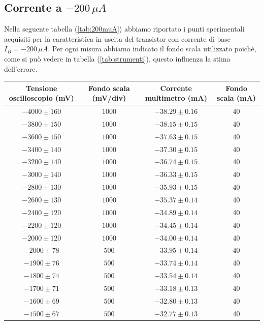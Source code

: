 \documentclass[]{article}
\begin{document}
\subsection{Corrente a $ -200\,\mu A $}
Nella seguente tabella (\ref{tab:200muA}) abbiamo riportato i punti sperimentali acquisiti per la caratteristica in uscita del transistor con corrente di base $ I_{B}= -200\,\mu A $. Per ogni misura abbiamo indicato il fondo scala utilizzato poichè, come si può vedere in tabella (\ref{tab:strumenti}), questo influenza la stima dell'errore.
	\begin{table}[H]
		\centering
	\begin{tabular}{|c|c|c|c|}
		\hline
		Tensione oscilloscopio (mV)& Fondo scala (mV/div) & Corrente multimetro (mA) &Fondo scala (mA)\\
		\hline
		$ -4000\pm 160 $ &$ 1000 $ & $ -38.29\pm 0.16 $ &40\\
		\hline
		$-3800\pm150 $ &$ 1000 $ & $ -38.15\pm0.15 $ &40 \\
		\hline
		$ -3600\pm 150 $ &$ 1000 $ & $ -37.63\pm 0.15 $ &40 \\
		\hline
		$ -3400\pm 140 $ &$ 1000 $ & $ -37.30\pm 0.15 $ &40 \\
		\hline
		$ -3200\pm 140 $ &$ 1000 $ & $-36.74\pm 0.15$ &40 \\
		\hline
		$ -3000\pm 140 $ &$ 1000 $ & $ -36.33\pm 0.15 $ &40 \\
		\hline
		$ -2800\pm 130 $ &$ 1000 $ & $ -35.93\pm 0.15 $ &40 \\
		\hline
		$ -2600\pm 130 $ &$ 1000 $ & $ -35.37\pm 0.14 $ &40 \\
		\hline
		$ -2400\pm 120 $ &$ 1000 $ & $ -34.89\pm 0.14 $ &40 \\
		\hline
		$ -2200\pm 120 $ &$ 1000 $ & $ -34.45\pm 0.14 $ &40 \\
		\hline
		$ -2000\pm 120 $ &$ 1000 $ & $ -34.00\pm0.14 $  &40\\
		\hline
		$ -2000\pm 78 $ &$ 500 $ & $ -33.95\pm0.14 $  &40\\
		\hline
		$ -1900\pm 76 $ &$ 500 $ & $ -33.74\pm0.14 $  &40\\
		\hline
		$ -1800\pm 74 $ &$ 500 $ & $ -33.54\pm 0.14 $ &40 \\
		\hline
		$ -1700\pm 71 $ &$ 500 $ & $ -33.18\pm 0.13 $ &40 \\
		\hline
		$ -1600\pm 69 $ &$ 500 $ & $ -32.80\pm 0.13 $ &40 \\
		\hline
		$ -1500\pm 67 $ &$ 500 $ & $ -32.77\pm 0.13 $ &40 \\

\end{tabular}
\end{table}
\end{document}
